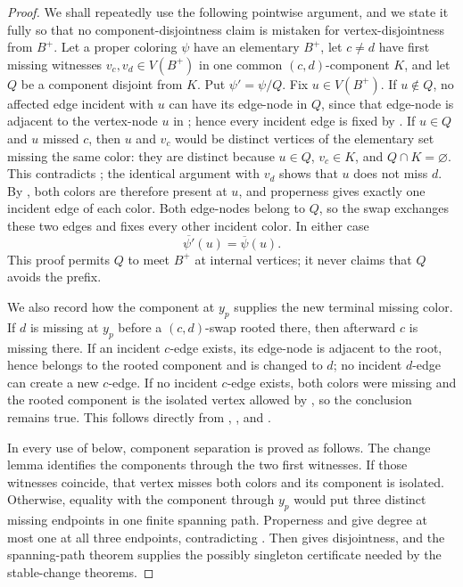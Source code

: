 \begin{proof}
We shall repeatedly use the following pointwise argument, and we state it
fully so that no component-disjointness claim is mistaken for
vertex-disjointness from \(B^+\).  Let a proper coloring \(\psi\) have an
elementary \(B^+\), let \(c\ne d\) have first missing witnesses
\(v_c,v_d\in V(B^+)\) in one common \((c,d)\)-component \(K\), and let
\(Q\) be a component disjoint from \(K\).  Put
\(\psi'=\psi/Q\).  Fix \(u\in V(B^+)\).  If \(u\notin Q\), no affected
edge incident with \(u\) can have its edge-node in \(Q\), since that
edge-node is adjacent to the vertex-node \(u\) in
; hence every incident edge is fixed by
.  If \(u\in Q\) and \(u\) missed \(c\),
then \(u\) and \(v_c\) would be distinct vertices of the elementary set
missing the same color: they are distinct because \(u\in Q\),
\(v_c\in K\), and \(Q\cap K=\varnothing\).  This contradicts
; the identical argument with
\(v_d\) shows that \(u\) does not miss \(d\).  By
, both colors are therefore present at \(u\), and
properness gives exactly one incident edge of each color.  Both edge-nodes
belong to \(Q\), so the swap exchanges these two edges and fixes every
other incident color.  In either case
\[
             \overline{\psi'}(u)=\overline\psi(u).             \tag{8}
\]
This proof permits \(Q\) to meet \(B^+\) at internal vertices; it never
claims that \(Q\) avoids the prefix.

We also record how the component at \(y_p\) supplies the new terminal
missing color.  If \(d\) is missing at \(y_p\) before a \((c,d)\)-swap
rooted there, then afterward \(c\) is missing there.  If an incident
\(c\)-edge exists, its edge-node is adjacent to the root, hence belongs
to the rooted component and is changed to \(d\); no incident \(d\)-edge
can create a new \(c\)-edge.  If no incident \(c\)-edge exists, both
colors were missing and the rooted component is the isolated vertex
allowed by , so the conclusion remains
true.  This follows directly from ,
, and
.

In every use of  below, component separation is
proved as follows.  The change lemma identifies the components through
the two first witnesses.  If those witnesses coincide, that vertex misses
both colors and its component is isolated.  Otherwise, equality with the
component through \(y_p\) would put three distinct missing endpoints in
one finite spanning path.  Properness and
 give degree at most one at all
three endpoints, contradicting .
Then  gives disjointness, and the
spanning-path theorem supplies the possibly singleton
 certificate needed by the stable-change
theorems.


\end{proof}
